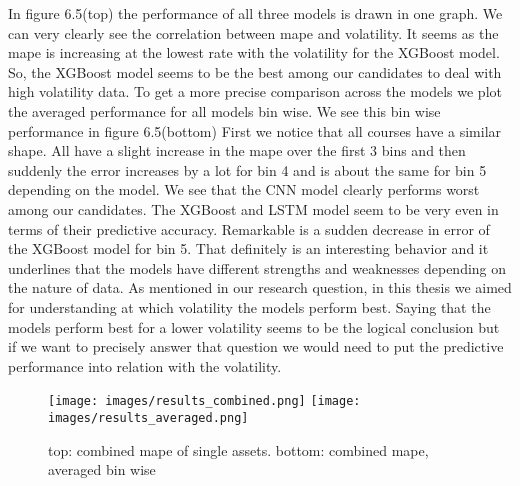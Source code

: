 \documentclass[a4paper,12pt]{report}
\begin{document}
In figure 6.5(top) the performance of all three models is drawn in one graph. We can very clearly see the correlation between mape and volatility. It seems as the mape is increasing at the lowest rate with the volatility for the XGBoost model. So, the XGBoost model seems to be the best among our candidates to deal with high volatility data. To get a more precise comparison across the models we plot the averaged performance for all models bin wise. We see this bin wise performance in figure 6.5(bottom) First we notice that all courses have a similar shape. All have a slight increase in the mape over the first 3 bins and then suddenly the error increases by a lot for bin 4 and is about the same for bin 5 depending on the model. We see that the CNN model clearly performs worst among our candidates. The XGBoost and LSTM model seem to be very even in terms of their predictive accuracy. Remarkable is a sudden decrease in error of the XGBoost model for bin 5. That definitely is an interesting behavior and it underlines that the models have different strengths and weaknesses depending on the nature of data. As mentioned in our research question, in this thesis we aimed for understanding at which volatility the models perform best. Saying that the models perform best for a lower volatility seems to be the logical conclusion but if we want to precisely answer that question we would need to put the predictive performance into relation with the volatility.


\begin{wrapfigure}{r}{0.5\textwidth}
  \texttt{[image: images/results\_combined.png]}
  \texttt{[image: images/results\_averaged.png]}
  \caption{top: combined mape of single assets. bottom: combined mape, averaged bin wise}
  \label{fig:wrapped}
\end{wrapfigure}
\end{document}
